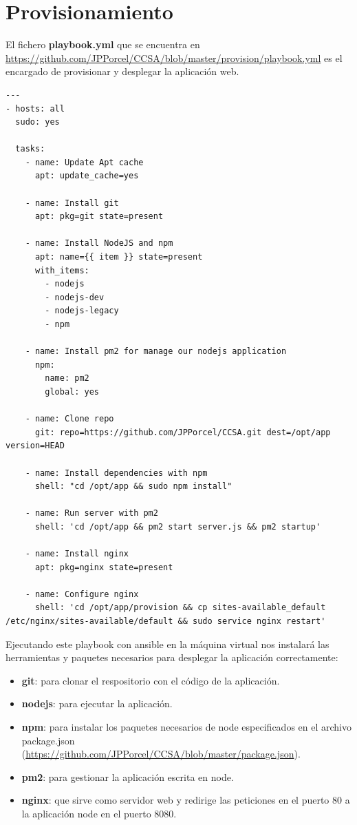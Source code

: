 \section{Provisionamiento}

El fichero \textbf{playbook.yml} que se encuentra en \url{https://github.com/JPPorcel/CCSA/blob/master/provision/playbook.yml} es el encargado de provisionar y desplegar la aplicación web. \\

\begin{lstlisting}
---
- hosts: all
  sudo: yes
  
  tasks:
    - name: Update Apt cache
      apt: update_cache=yes
    
    - name: Install git
      apt: pkg=git state=present

    - name: Install NodeJS and npm
      apt: name={{ item }} state=present
      with_items:
        - nodejs
        - nodejs-dev
        - nodejs-legacy
        - npm
    
    - name: Install pm2 for manage our nodejs application
      npm:
        name: pm2
        global: yes
    
    - name: Clone repo
      git: repo=https://github.com/JPPorcel/CCSA.git dest=/opt/app version=HEAD
      
    - name: Install dependencies with npm
      shell: "cd /opt/app && sudo npm install"
      
    - name: Run server with pm2
      shell: 'cd /opt/app && pm2 start server.js && pm2 startup'
      
    - name: Install nginx
      apt: pkg=nginx state=present
      
    - name: Configure nginx
	  shell: 'cd /opt/app/provision && cp sites-available_default /etc/nginx/sites-available/default && sudo service nginx restart'
\end{lstlisting}

Ejecutando este playbook con ansible en la máquina virtual nos instalará las herramientas y paquetes necesarios para desplegar la aplicación correctamente: \\

\begin{itemize}
	\item \textbf{git}: para clonar el respositorio con el código de la aplicación.
	\item \textbf{nodejs}: para ejecutar la aplicación.
	\item \textbf{npm}: para instalar los paquetes necesarios de node especificados en el archivo package.json (\url{https://github.com/JPPorcel/CCSA/blob/master/package.json}).
	\item \textbf{pm2}: para gestionar la aplicación escrita en node.
	\item \textbf{nginx}: que sirve como servidor web y redirige las peticiones en el puerto 80 a la aplicación node en el puerto 8080.
\end{itemize}

